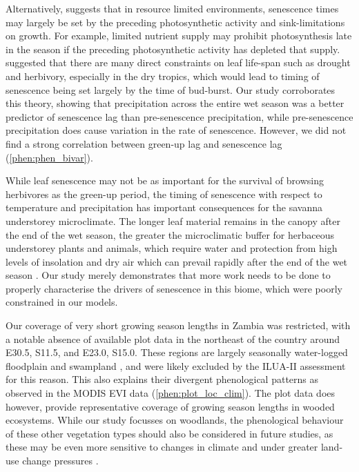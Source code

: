 \begin{refsection}
Alternatively, \citet{Zani2020} suggests that in resource limited environments, senescence times may largely be set by the preceding photosynthetic activity and sink-limitations on growth. For example, limited nutrient supply may prohibit photosynthesis late in the season if the preceding photosynthetic activity has depleted that supply. \citet{Reich1992} suggested that there are many direct constraints on leaf life-span such as drought and herbivory, especially in the dry tropics, which would lead to timing of senescence being set largely by the time of bud-burst. Our study corroborates this theory, showing that precipitation across the entire wet season was a better predictor of senescence lag than pre-senescence precipitation, while pre-senescence precipitation does cause variation in the rate of senescence. However, we did not find a strong correlation between green-up lag and senescence lag (\autoref{phen:phen_bivar}).

While leaf senescence may not be as important for the survival of browsing herbivores as the green-up period, the timing of senescence with respect to temperature and precipitation has important consequences for the savanna understorey microclimate. The longer leaf material remains in the canopy after the end of the wet season, the greater the microclimatic buffer for herbaceous understorey plants and animals, which require water and protection from high levels of insolation and dry air which can prevail rapidly after the end of the wet season \citep{Guan2014}. Our study merely demonstrates that more work needs to be done to properly characterise the drivers of senescence in this biome, which were poorly constrained in our models.

Our coverage of very short growing season lengths in Zambia was restricted, with a notable absence of available plot data in the northeast of the country around E30.5\textdegree{}, S11.5\textdegree{}, and E23.0\textdegree{}, S15.0\textdegree{}. These regions are largely seasonally water-logged floodplain and swampland \citep{White1983, Dinerstein2017}, and were likely excluded by the ILUA-II assessment for this reason. This also explains their divergent phenological patterns as observed in the MODIS EVI data (\autoref{phen:plot_loc_clim}). The plot data does however, provide representative coverage of growing season lengths in wooded ecosystems. While our study focusses on woodlands, the phenological behaviour of these other vegetation types should also be considered in future studies, as these may be even more sensitive to changes in climate \citep{Dean2018} and under greater land-use change pressures \citep{Langan2018}.


\end{refsection}
